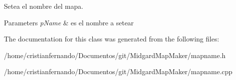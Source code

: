 Setea el nombre del mapa. 


\begin{DoxyParams}{Parameters}
{\em p\-Name} & es el nombre a setear \\
\hline
\end{DoxyParams}


The documentation for this class was generated from the following files\-:\begin{DoxyCompactItemize}
\item 
/home/cristianfernando/\-Documentos/git/\-Midgard\-Map\-Maker/mapname.\-h\item 
/home/cristianfernando/\-Documentos/git/\-Midgard\-Map\-Maker/mapname.\-cpp\end{DoxyCompactItemize}
